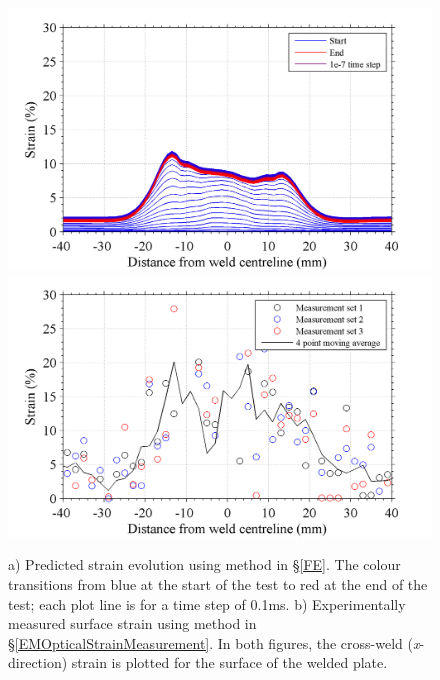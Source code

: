 \begin{figure}[h!]
	\centering
	\includegraphics[width=1\linewidth]{BlastStrainPredictaltered}
	\includegraphics[width=1\linewidth]{BlastStrainaltered}
	\caption[Mesh]{a) Predicted strain evolution using method in \S\ref{FE}. The colour transitions from blue at the start of the test to red at the end of the test; each plot line is for a time step of 0.1ms. b) Experimentally measured surface strain using method in \S\ref{EMOpticalStrainMeasurement}. In both figures, the cross-weld (\textit{x}-direction) strain is plotted for the surface of the welded plate.}
	\label{fig:BlastStrainPredicted}
\end{figure} 
